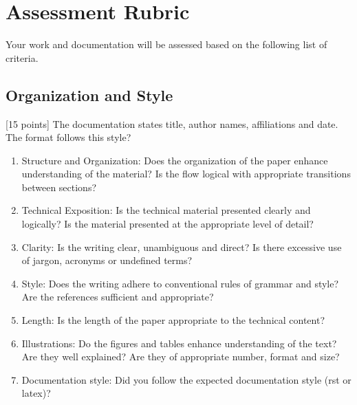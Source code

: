 \documentclass[letterpaper,10pt,english]{sphinxmanual}
\begin{document}
\sphinxstepscope


\chapter{Assessment Rubric}
\label{\detokenize{docs/rubric:assessment-rubric}}\label{\detokenize{docs/rubric::doc}}
\sphinxAtStartPar
Your work and documentation will be assessed based on the following list of criteria.


\section{Organization and Style}
\label{\detokenize{docs/rubric:organization-and-style}}
\sphinxAtStartPar
{[}15 points{]} The documentation states  title, author names, affiliations and date. The format follows this style?
\begin{enumerate}
%
\item {} 
\sphinxAtStartPar
Structure and Organization: Does the organization of the paper enhance understanding of the material? Is the flow logical with appropriate transitions between sections?

\item {} 
\sphinxAtStartPar
Technical Exposition: Is the technical material presented clearly and logically? Is the material presented at the appropriate level of detail?

\item {} 
\sphinxAtStartPar
Clarity: Is the writing clear, unambiguous and direct? Is there excessive use of jargon, acronyms or undefined terms?

\item {} 
\sphinxAtStartPar
Style: Does the writing adhere to conventional rules of grammar and style? Are the references sufficient and appropriate?

\item {} 
\sphinxAtStartPar
Length: Is the length of the paper appropriate to the technical content?

\item {} 
\sphinxAtStartPar
Illustrations: Do the figures and tables enhance understanding of the text? Are they well explained? Are they of appropriate number, format and size?

\item {} 
\sphinxAtStartPar
Documentation style: Did you follow the expected documentation style (rst or latex)?

\end{enumerate}
\end{document}
